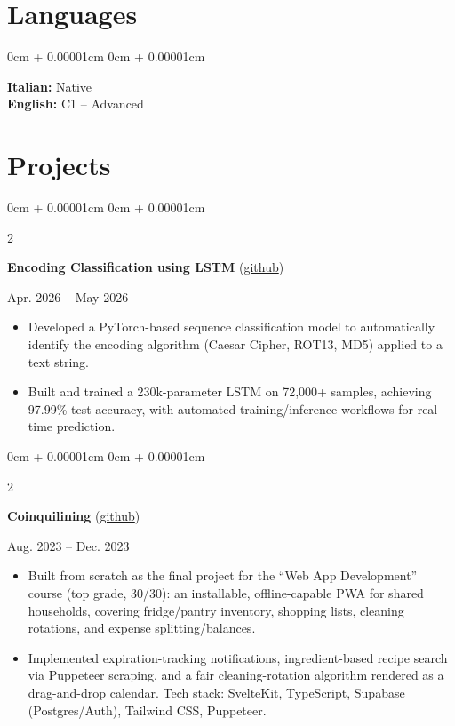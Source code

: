 \documentclass[10pt, letterpaper]{article}
\newenvironment{highlights}{
    \begin{itemize}[
        topsep=0.04cm,
        parsep=0pt,
        partopsep=0pt,
        itemsep=0pt,
        leftmargin=10pt
    ]
}{
    \end{itemize}
}
\newenvironment{onecolentry}{
    \begin{adjustwidth}{
        0cm + 0.00001cm
    }{
        0cm + 0.00001cm
    }
}{
    \end{adjustwidth}
}
\newenvironment{twocolentry}[2][]{
    \onecolentry
    \def\secondColumn{#2}
    \setcolumnwidth{\fill, 4.5cm}
    \begin{paracol}{2}
}{
    \switchcolumn
    \raggedleft
    \secondColumn
    \end{paracol}
    \endonecolentry
}
\begin{document}
\section{Languages}

\begin{onecolentry}
    \textbf{Italian:} Native \\
    \textbf{English:} C1 -- Advanced
\end{onecolentry}

\section{Projects}

\begin{twocolentry}{
        Apr. 2026 -- May 2026
    }
    \textbf{Encoding Classification using LSTM}
    (\href{https://github.com/FlavRomano/encoding-classifier-lstm}{github})
\end{twocolentry}

\begin{highlights}
    \item Developed a PyTorch-based sequence classification model to automatically identify the encoding algorithm (Caesar Cipher, ROT13, MD5) applied to a text string.

    \item Built and trained a 230k-parameter LSTM on 72,000+ samples, achieving 97.99\% test accuracy, with automated training/inference workflows for real-time prediction.
\end{highlights}

\begin{twocolentry}{
        Aug. 2023 -- Dec. 2023
    }
    \textbf{Coinquilining}
    (\href{https://github.com/FlavRomano/coinquilining}{github})
\end{twocolentry}

\begin{highlights}
    \item Built from scratch as the final project for the ``Web App Development'' course (top grade, 30/30): an installable, offline-capable PWA for shared households, covering fridge/pantry inventory, shopping lists, cleaning rotations, and expense splitting/balances.

    \item Implemented expiration-tracking notifications, ingredient-based recipe search via Puppeteer scraping, and a fair cleaning-rotation algorithm rendered as a drag-and-drop calendar. Tech stack: SvelteKit, TypeScript, Supabase (Postgres/Auth), Tailwind CSS, Puppeteer.
\end{highlights}
\end{document}
